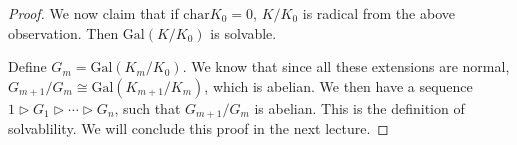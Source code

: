 \documentclass[a4paper,twoside,master.tex]{subfiles}
\begin{document}
\begin{proof}
    We now claim that if $ \text{char} K_0 = 0 $, $ K/K_0 $ is radical from the above observation. Then $ \text{Gal}(K/K_0) $ is solvable.

    Define $ G_m = \text{Gal}(K_m / K_0) $. We know that since all these extensions are normal, $ G_{m+1} / G_m \cong \text{Gal}(K_{m+1} / K_{m}) $, which is abelian. We then have a sequence $ 1 \triangleright G_1 \triangleright \cdots \triangleright G_n $, such that $ G_{m+1} / G_m $ is abelian. This is the definition of solvablility. We will conclude this proof in the next lecture.
\end{proof}
\end{document}
